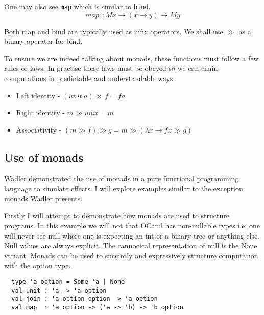 \documentclass[a4paper,10pt]{article}
\theoremstyle{definition}
\begin{document}
One may also see \texttt{map} which is similar to \texttt{bind}.
\begin{equation}
  map :: M x \rightarrow (x \rightarrow y) \rightarrow M y
\end{equation}

Both map and bind are typically used as infix operators.
We shall use $\gg$ as a binary operator for bind.

To ensure we are indeed talking about monads, these functions must follow a few
rules or laws. In practise these laws must be obeyed so we can chain computations
in predictable and understandable ways.

\begin{itemize}
	\item Left identity - $(unit\ a) \gg f = f a$
	\item Right identity - $m \gg unit = m$
	\item Associativity - $(m \gg f) \gg g = m \gg (\lambda x \rightarrow f x \gg g)$
\end{itemize}


\subsection{Use of monads}

Wadler \cite{wadler1990comprehending} demonstrated the use of monads in a pure
functional programming language to simulate effects. I will explore examples similar to
the exception monads Wadler presents.

Firstly I will attempt to demonstrate how monads are used to structure programs.
In this example we will not that OCaml has non-nullable types
i.e; one will never see null where one is expecting an
int or a binary tree or anything else.
Null values are always explicit.
The cannocical representation of null is the None variant.
Monads can be used to succintly and expressively structure computation with the option type.

\begin{verbatim}
  type 'a option = Some 'a | None
  val unit : 'a -> 'a option
  val join : 'a option option -> 'a option
  val map  : 'a option -> ('a -> 'b) -> 'b option
\end{verbatim}
\end{document}
